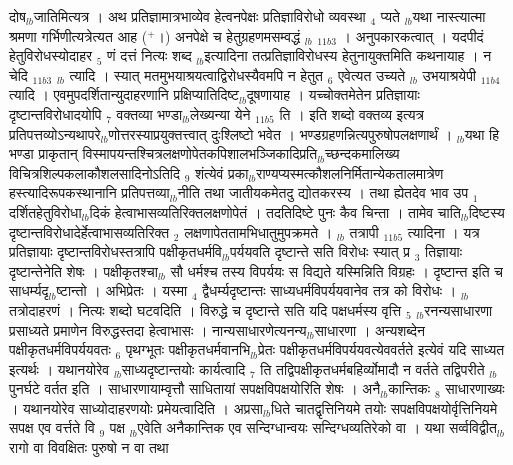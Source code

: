 \documentclass[article,12pt,a4paper]{memoir}%
\newcommand{\add}[1]{($^{+}$#1)}
\begin{document}
दोष{\tiny $_{lb}$}जातिमित्यत्र । अथ प्रतिज्ञामात्रभाव्येव हेत्वनपेक्षः प्रतिज्ञाविरोधो व्यवस्था {\tiny $_{4}$} प्यते {\tiny $_{lb}$}यथा नास्त्यात्मा श्रमणा गर्भिणीत्यत्रेत्यत आह \add{।} {\color{DodgerBlue3}अनपेक्षे च हेतुग्रहणमसम्वद्धं} {\tiny $_{lb}$} {\tiny $_{11b3}$} । अनुपकारकत्वात् । यदपीदं हेतुविरोधस्योदाहर {\tiny $_{5}$} णं दत्तं नित्यः शब्द {\tiny $_{lb}$}इत्यादिना तत्प्रतिज्ञाविरोधस्य हेतुनायुक्तमिति कथनायाह । न {\color{DodgerBlue3}चेदि {\tiny $_{11b3}$} {\tiny $_{lb}$} त्यादि} । स्यात् मतमुभयाश्रयत्वाद्विरोधस्यैवमपि न हेतुत {\tiny $_{6}$} एवेत्यत उच्यते {\tiny $_{lb}$} {\color{DodgerBlue3}उभयाश्रयेपी {\tiny $_{11b4}$} त्यादि} । एवमुपदर्शितान्युदाहरणानि प्रक्षिप्यातिदिष्ट{\tiny $_{lb}$}दूषणायाह । यच्चोक्तमेतेन प्रतिज्ञायाः दृष्टान्तविरोधादयोपि {\tiny $_{7}$} वक्तव्या {\color{DodgerBlue3}भण्डा{\tiny $_{lb}$}लेख्यन्या} येने {\tiny $_{11b5}$} ति । इति शब्दो वक्तव्य इत्यत्र प्रतिपत्तव्योऽन्यथापरे{\tiny $_{lb}$}णोत्तरस्याप्रयुक्तत्त्वात् दुःश्लिष्टो भवेत । भण्डग्रहणन्नित्यपुरुषोपलक्षणार्थं । {\tiny $_{lb}$}यथा हि भण्डा प्राकृतान् विस्मापयन्तश्चित्रलक्षणोपेतकपिशालभञ्जिकादिप्रति{\tiny $_{lb}$}च्छन्दकमालिख्य विचित्रशिल्पकलाकौशलसादिनोऽतिदि {\tiny $_{9}$} \leavevmode{} शंत्येवं प्रका{\tiny $_{lb}$}राण्यप्यस्मत्कौशलनिर्मितान्येकतालमात्रेण हस्त्यादिरूपकस्थानानि प्रतिपत्तव्या{\tiny $_{lb}$}नीति तथा जातीयकमेतदु {\color{DodgerBlue3}द्योतकरस्य} । तथा ह्येतदेव भाव उप {\tiny $_{1}$} दर्शितहेतुविरोधा{\tiny $_{lb}$}दिकं हेत्वाभासव्यतिरिक्तलक्षणोपेतं । तदतिदिष्टे पुनः कैव चिन्ता । तामेव चाति{\tiny $_{lb}$}दिष्टस्य दृष्टान्तविरोधादेर्हेत्वाभासव्यतिरिक्त {\tiny $_{2}$} लक्षणापेततामभिधातुमुपक्रमते । {\tiny $_{lb}$} {\color{DodgerBlue3}तत्रापी} {\tiny $_{11b5}$} त्यादिना । यत्र प्रतिज्ञायाः दृष्टान्तविरोधस्तत्रापि पक्षीकृतधर्मवि{\tiny $_{lb}$}पर्ययवति दृष्टान्ते सति विरोधः स्यात् प्र {\tiny $_{3}$} तिज्ञायाः दृष्टान्तेनेति शेषः । पक्षीकृतश्चा{\tiny $_{lb}$} \leavevmode{} सौ धर्मश्च तस्य विपर्ययः स विद्यते यस्मिन्निति विग्रहः । दृष्टान्त इति च साधर्म्यदृ{\tiny $_{lb}$}ष्टान्तो । अभिप्रेतः । यस्मा {\tiny $_{4}$} द्वैधर्म्यदृष्टान्तः साध्यधर्मविपर्ययवानेव तत्र को विरोधः । {\tiny $_{lb}$}तत्रोदाहरणं । नित्यः शब्दो घटवदिति । विरुद्धे च दृष्टान्ते सति यदि पक्षधर्मस्य वृत्ति {\tiny $_{5}$} {\tiny $_{lb}$}रनन्यसाधारणा प्रसाध्यते प्रमाणेन विरुद्धस्तदा हेत्वाभासः । नान्यसाधारणेत्यनन्य{\tiny $_{lb}$}साधारणा । अन्यशब्देन पक्षीकृतधर्मविपर्ययवतः {\tiny $_{6}$} पृथग्भूतः पक्षीकृतधर्मवानभि{\tiny $_{lb}$}प्रेतः पक्षीकृतधर्मविपर्ययवत्येववर्तते इत्येवं यदि साध्यत इत्यर्थः । यथानयोरेव {\tiny $_{lb}$}साध्यदृष्टान्तयोः कार्यत्वादि {\tiny $_{7}$} ति तद्विपक्षीकृतधर्मबहिर्व्योमादौ न वर्तते तद्विपरीते {\tiny $_{lb}$}पुनर्घटे वर्तत इति । साधारणायाम्वृत्तौ साधितायां सपक्षविपक्षयोरिति शेषः । अनै{\tiny $_{lb}$}कान्तिकः {\tiny $_{8}$} साधारणाख्यः । यथानयोरेव साध्योदाहरणयोः प्रमेयत्वादिति । अप्रसा{\tiny $_{lb}$}धिते चातद्वृत्तिनियमे तयोः सपक्षविपक्षयोर्वृत्तिनियमे सपक्ष एव वर्त्तते वि {\tiny $_{9}$} \leavevmode{} पक्ष {\tiny $_{lb}$}एवेति अनैकान्तिक एव सन्दिग्धान्वयः सन्दिग्धव्यतिरेको वा । यथा सर्व्वविद्वीत{\tiny $_{lb}$}रागो वा विवक्षितः पुरुषो न वा तथा 
\end{document}
